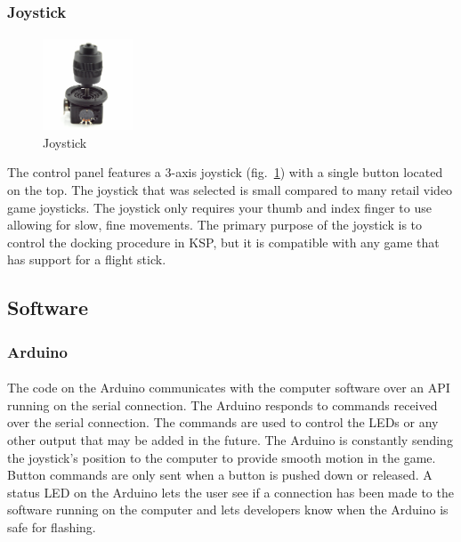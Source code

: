 \documentclass[12pt,a4paper]{article}
\begin{document}
		\subsubsection{Joystick}
			\paragraph{}
			\begin{figure}
				\vspace*{-1cm}
    			\centering
    			\includegraphics[width=0.24\textwidth]{joystick}
    			\caption{Joystick}
    			\label{fig:joystick}
			\end{figure}
			The control panel features a 3-axis joystick (fig.~\ref{fig:joystick}) with a single button located on the top. The joystick that was selected is small compared to many retail video game joysticks. The joystick only requires your thumb and index finger to use allowing for slow, fine movements. The primary purpose of the joystick is to control the docking procedure in \gls{KSP}, but it is compatible with any game that has support for a flight stick.
		\subsection{Software}
			\subsubsection{Arduino}
				\paragraph{}
				The code on the Arduino communicates with the computer software over an \gls{API} running on the serial connection. The Arduino responds to commands received over the serial connection. The commands are used to control the \glspl{LED} or any other output that may be added in the future. The Arduino is constantly sending the joystick's position to the computer to provide smooth motion in the game. Button commands are only sent when a button is pushed down or released. A status \gls{LED} on the Arduino lets the user see if a connection has been made to the software running on the computer and lets developers know when the Arduino is safe for flashing.
\end{document}
